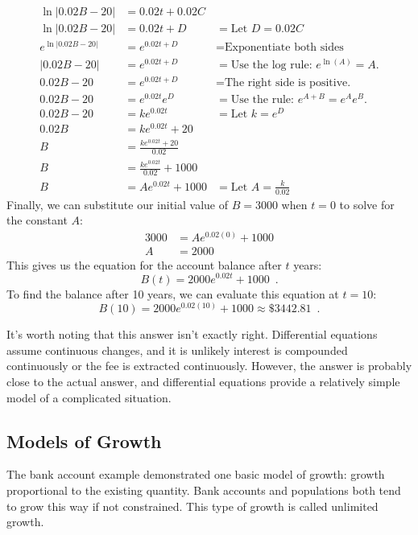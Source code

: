 \begin{example}
\begin{solution}
\begin{align*}
\ln|0.02B-20|     &= 0.02t+0.02C  \\
\ln|0.02B-20|     &= 0.02t+D      &= \text{Let }D=0.02C\\
e^{\ln|0.02B-20|} &= e^{0.02t+D}  &= \text{Exponentiate both sides}\\
|0.02B-20|        &= e^{0.02t+D}  &= \text{Use the log rule: } e^{\ln(A)}=A.\\
0.02B-20          &= e^{0.02t+D}  &= \text{The right side is positive.}\\
0.02B-20          &= e^{0.02t}e^D &= \text{Use the rule: } e^{A+B}=e^Ae^B.\\
0.02B-20          &= ke^{0.02t}   &= \text{Let } k=e^D\\
0.02B             &= ke^{0.02t} + 20   \\
B                 &= \frac{ke^{0.02t} + 20}{0.02} \\
B                 &= \frac{ke^{0.02t}}{0.02} + 1000 \\
B                 &= Ae^{0.02t}+1000 &= \text{Let } A = \frac{k}{0.02}
\end{align*}
Finally, we can substitute our initial value of $B=3000$ when $t=0$ to solve for the constant $A$:
\begin{align*}
3000  &= Ae^{0.02(0)}+1000 \\
A     &= 2000
\end{align*}
This gives us the equation for the account balance after $t$ years:
$$B(t)=2000e^{0.02t}+1000 \enspace .$$
To find the balance after 10 years, we can evaluate this equation at $t=10$:
$$B(10)=2000e^{0.02(10)}+1000 \approx   \$3442.81 \enspace .$$
\end{solution}\end{example}

It's worth noting that this answer isn't exactly right. Differential equations assume continuous changes, and it is unlikely interest is compounded continuously or the fee is extracted continuously. However, the answer is probably close to the actual answer, and differential equations provide a relatively simple model of a complicated situation.

\subsection{Models of Growth}
The bank account example demonstrated one basic model of growth: growth proportional to the existing quantity. Bank accounts and populations both tend to grow this way if not constrained. This type of growth is called unlimited growth.

